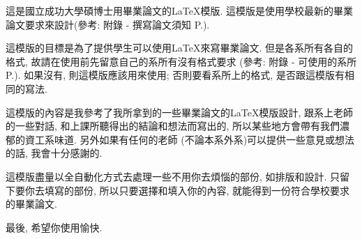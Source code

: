 \StartAbstractChi

這是國立成功大學碩博士用畢業論文的LaTeX模版. 這模版是使用學校最新的畢業論文要求來設計(參考: 附錄 - 撰寫論文須知 P.).

這模版的目標是為了提供學生可以使用LaTeX來寫畢業論文. 但是各系所有各自的格式, 故請在使用前先留意自己的系所有沒有格式要求 (參考: 附錄 - 可使用的系所 P.). 如果沒有, 則這模版應該用來使用; 否則要看系所上的格式, 是否跟這模版有相同的寫法.

這模版的內容是我參考了我所拿到的一些畢業論文的LaTeX模版設計, 跟系上老師的一些對話, 和上課所聽得出的結論和想法而寫出的, 所以某些地方會帶有我們濃郁的資工系味道. 另外如果有任何的老師 (不論本系外系)可以提供一些意見或想法的話, 我會十分感謝的.

這模版盡量以全自動化方式去處理一些不用你去煩惱的部份, 如排版和設計. 只留下要你去填寫的部份, 所以只要選擇和填入你的內容, 就能得到一份符合學校要求的畢業論文.

最後, 希望你使用愉快.

\EndAbstractChi
